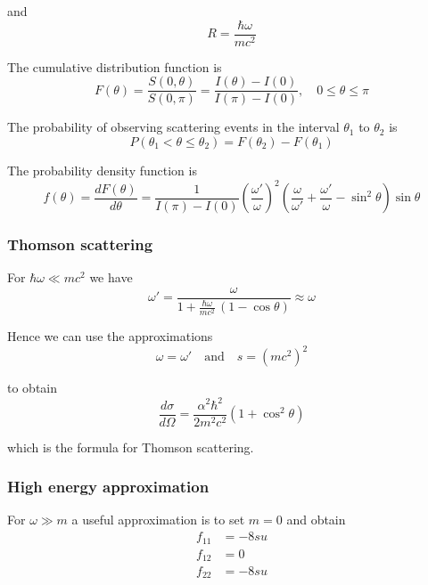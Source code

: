 and
\begin{equation*}
R=\frac{\hbar\omega}{mc^2}
\end{equation*}

The cumulative distribution function is
\begin{equation*}
F(\theta)
=\frac{S(0,\theta)}{S(0,\pi)}
=\frac{I(\theta)-I(0)}{I(\pi)-I(0)},
\quad
0\le\theta\le\pi
\end{equation*}

The probability of observing scattering events in the interval $\theta_1$ to $\theta_2$ is
\begin{equation*}
P(\theta_1<\theta\le\theta_2)=F(\theta_2)-F(\theta_1)
\end{equation*}

The probability density function is
\begin{equation*}
f(\theta)=\frac{dF(\theta)}{d\theta}
=\frac{1}{I(\pi)-I(0)}
\left(\frac{\omega'}{\omega}\right)^2
\left(\frac{\omega}{\omega'}+\frac{\omega'}{\omega}-\sin^2\theta\right)
\sin\theta
\end{equation*}

\subsubsection*{Thomson scattering}

For $\hbar\omega\ll mc^2$ we have
\begin{equation*}
\omega'=\frac{\omega}{1+\frac{\hbar\omega}{mc^2}\,(1-\cos\theta)}\approx\omega
\end{equation*}

Hence we can use the approximations
\begin{equation*}
\omega=\omega'\quad\text{and}\quad s=(mc^2)^2
\end{equation*}

to obtain
\begin{equation*}
\frac{d\sigma}{d\Omega}=\frac{\alpha^2\hbar^2}{2m^2c^2}\left(1+\cos^2\theta\right)
\end{equation*}

which is the formula for Thomson scattering.

\subsubsection*{High energy approximation}

For $\omega\gg m$ a useful approximation is to set $m=0$ and obtain
\begin{align*}
f_{11}&=-8su
\\
f_{12}&=0
\\
f_{22}&=-8su
\end{align*}

